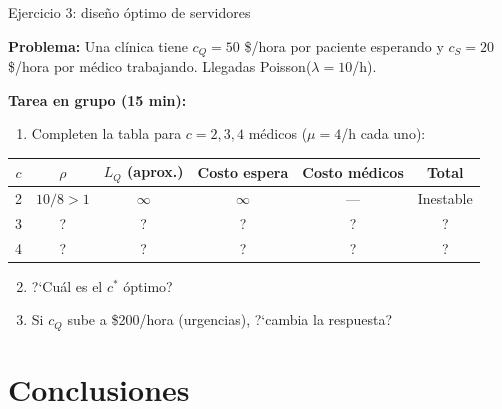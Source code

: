 \documentclass[aspectratio=1610, 9pt]{beamer}
\begin{document}
\begin{frame}{Ejercicio 3: dise\~{n}o \'{o}ptimo de servidores}

\textbf{Problema:} Una cl\'{i}nica tiene $c_Q = 50$ \$/hora por paciente esperando y $c_S = 20$ \$/hora por m\'{e}dico trabajando. Llegadas Poisson($\lambda = 10$/h).

\vspace{0.3cm}
\textbf{Tarea en grupo (15 min):}

\vspace{0.2cm}
\begin{enumerate}
    \item Completen la tabla para $c = 2, 3, 4$ m\'{e}dicos ($\mu = 4$/h cada uno):
\end{enumerate}

\vspace{0.1cm}
\begin{center}
\small
\begin{tabular}{cccccc}
\toprule
$c$ & $\rho$ & $L_Q$ (aprox.) & Costo espera & Costo m\'{e}dicos & \textbf{Total} \\
\midrule
2 & $10/8 > 1$ & $\infty$ & $\infty$ & --- & Inestable \\
3 & ? & ? & ? & ? & ? \\
4 & ? & ? & ? & ? & ? \\
\bottomrule
\end{tabular}
\end{center}

\vspace{0.2cm}
\begin{enumerate}
    \setcounter{enumi}{1}
    \item ?`Cu\'{a}l es el $c^*$ \'{o}ptimo?
    \item Si $c_Q$ sube a \$200/hora (urgencias), ?`cambia la respuesta?
\end{enumerate}
\end{frame}

\section{Conclusiones}
\end{document}
